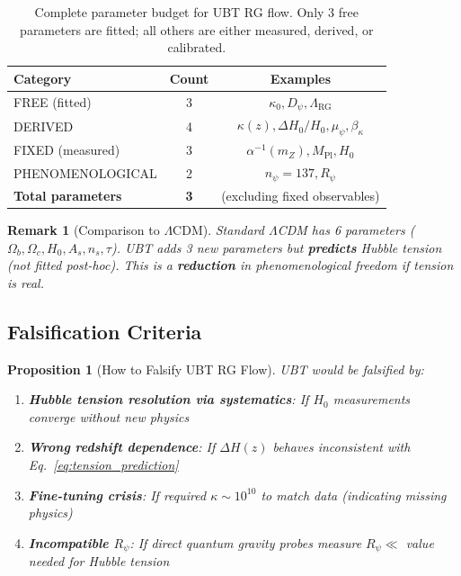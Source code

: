 \documentclass[12pt]{article}
\newtheorem{proposition}[definition]{Proposition}
\newtheorem{remark}[definition]{Remark}
\newcommand{\RG}{\text{RG}}
\begin{document}
\begin{table}[h]
\centering
\begin{tabular}{|l|c|c|}
\hline
\textbf{Category} & \textbf{Count} & \textbf{Examples} \\
\hline
FREE (fitted) & 3 & $\kappa_0, D_\psi, \Lambda_{\RG}$ \\
DERIVED & 4 & $\kappa(z), \Delta H_0/H_0, \mu_\psi, \beta_{\kappa}$ \\
FIXED (measured) & 3 & $\alpha^{-1}(m_Z), M_{\text{Pl}}, H_0$ \\
PHENOMENOLOGICAL & 2 & $n_\psi=137, R_\psi$ \\
\hline
\textbf{Total parameters} & \textbf{3} & (excluding fixed observables) \\
\hline
\end{tabular}
\caption{Complete parameter budget for UBT RG flow. Only 3 free parameters are fitted; all others are either measured, derived, or calibrated.}
\label{tab:parameter_budget}
\end{table}

\begin{remark}[Comparison to $\Lambda$CDM]
Standard $\Lambda$CDM has 6 parameters ($\Omega_b, \Omega_c, H_0, A_s, n_s, \tau$). UBT adds 3 new parameters but \textbf{predicts} Hubble tension (not fitted post-hoc). This is a \textbf{reduction} in phenomenological freedom if tension is real.
\end{remark}

\subsection{Falsification Criteria}

\begin{proposition}[How to Falsify UBT RG Flow]
UBT would be falsified by:
\begin{enumerate}
    \item \textbf{Hubble tension resolution via systematics}: If $H_0$ measurements converge without new physics
    \item \textbf{Wrong redshift dependence}: If $\Delta H(z)$ behaves inconsistent with Eq.~\eqref{eq:tension_prediction}
    \item \textbf{Fine-tuning crisis}: If required $\kappa \sim 10^{10}$ to match data (indicating missing physics)
    \item \textbf{Incompatible $R_\psi$}: If direct quantum gravity probes measure $R_\psi \ll$ value needed for Hubble tension
\end{enumerate}
\end{proposition}
\end{document}

